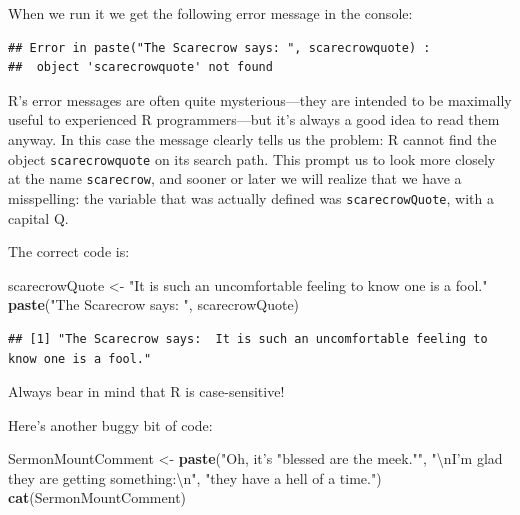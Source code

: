 \documentclass[]{book}
\makeatletter
\newenvironment{Shaded}{\begin{snugshade}}{\end{snugshade}}
\newcommand{\KeywordTok}[1]{\textcolor[rgb]{0.13,0.29,0.53}{\textbf{#1}}}
\newcommand{\CharTok}[1]{\textcolor[rgb]{0.31,0.60,0.02}{#1}}
\newcommand{\StringTok}[1]{\textcolor[rgb]{0.31,0.60,0.02}{#1}}
\newcommand{\NormalTok}[1]{#1}
\newenvironment{kframe}{%
\medskip{}
\setlength{\fboxsep}{.8em}
 \def\at@end@of@kframe{}%
 \ifinner\ifhmode%
  \def\at@end@of@kframe{\end{minipage}}%
  \begin{minipage}{\columnwidth}%
 \fi\fi%
 \def\FrameCommand##1{\hskip\@totalleftmargin \hskip-\fboxsep
 \colorbox{shadecolor}{##1}\hskip-\fboxsep
     \hskip-\linewidth \hskip-\@totalleftmargin \hskip\columnwidth}%
 \MakeFramed {\advance\hsize-\width
   \@totalleftmargin\z@ \linewidth\hsize
   \@setminipage}}%
 {\par\unskip\endMakeFramed%
 \at@end@of@kframe}
\renewenvironment{Shaded}{\begin{kframe}}{\end{kframe}}
\theoremstyle{definition}
\theoremstyle{definition}
\theoremstyle{definition}
\theoremstyle{remark}
\let\BeginKnitrBlock\begin \let\EndKnitrBlock\end
\makeatother
\begin{document}
When we run it we get the following error message in the console:

\begin{verbatim}
## Error in paste("The Scarecrow says: ", scarecrowquote) : 
##  object 'scarecrowquote' not found
\end{verbatim}

R's error messages are often quite mysterious---they are intended to be
maximally useful to experienced R programmers---but it's always a good
idea to read them anyway. In this case the message clearly tells us the
problem: R cannot find the object \texttt{scarecrowquote} on its search
path. This prompt us to look more closely at the name
\texttt{scarecrow}, and sooner or later we will realize that we have a
misspelling: the variable that was actually defined was
\texttt{scarecrowQuote}, with a capital Q.

The correct code is:

\begin{Shaded}
\begin{Highlighting}[]
\NormalTok{scarecrowQuote <-}\StringTok{ "It is such an uncomfortable feeling to know one is a fool."}
\KeywordTok{paste}\NormalTok{(}\StringTok{"The Scarecrow says: "}\NormalTok{, scarecrowQuote)}
\end{Highlighting}
\end{Shaded}

\begin{verbatim}
## [1] "The Scarecrow says:  It is such an uncomfortable feeling to know one is a fool."
\end{verbatim}

\BeginKnitrBlock{rmdimportant}
Always bear in mind that R is case-sensitive!
\EndKnitrBlock{rmdimportant}

Here's another buggy bit of code:

\begin{Shaded}
\begin{Highlighting}[]
\NormalTok{SermonMountComment <-}\StringTok{ }\KeywordTok{paste}\NormalTok{(}\StringTok{"Oh, it's "}\NormalTok{blessed are the meek.}\StringTok{""}\NormalTok{,}
                     \StringTok{"}\CharTok{\textbackslash{}n}\StringTok{I'm glad they are getting something:}\CharTok{\textbackslash{}n}\StringTok{"}\NormalTok{,}
                     \StringTok{"they have a hell of a time."}\NormalTok{)}
\KeywordTok{cat}\NormalTok{(SermonMountComment)}
\end{Highlighting}
\end{Shaded}
\end{document}
